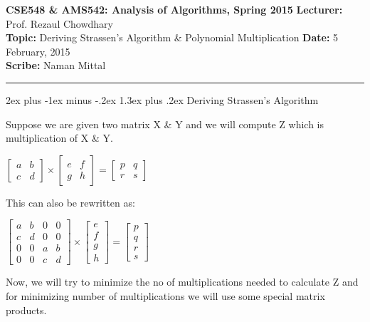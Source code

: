 \documentclass[11pt]{article}
\makeatletter
\renewcommand{\section}{\@startsection{section}{1}{0mm}%
                                   {2ex plus -1ex minus -.2ex}%
                                   {1.3ex plus .2ex}%
                                   {\normalfont\Large\bfseries}}%
\newcommand{\headings}[4]{
{\bf CSE548 \& AMS542: Analysis of Algorithms, Spring 2015} \hfill {{\bf Lecturer:} #1}\\
{{\bf Topic:} #2} \hfill {{\bf Date:} #3} \\
{{\bf Scribe:} #4}\\
\rule[0.1in]{\textwidth}{0.025in}
}
\makeatother
\begin{document}
\headings{Prof. Rezaul Chowdhary}{Deriving Strassen's Algorithm \& Polynomial Multiplication}{5 February, 2015}{Naman Mittal}
\newcommand{\lecnum}{3}  %

\section{Deriving Strassen's Algorithm}

Suppose we are given two matrix X \& Y and we will compute Z which is multiplication of X \& Y.

\begin{center}$\begin{bmatrix} a & b \\ c & d \end{bmatrix} \times \begin{bmatrix}e & f \\ g & h \end{bmatrix} = \begin{bmatrix} p & q \\ r & s \end{bmatrix}$\end{center}

This can also be rewritten as:

\begin{center}$\begin{bmatrix} a & b & 0 & 0 \\ c & d & 0 & 0 \\ 0 & 0 & a & b \\ 0 & 0 & c & d \end{bmatrix} \times \begin{bmatrix} e \\ f \\ g \\ h \end{bmatrix}= \begin{bmatrix} p \\ q \\ r \\ s \end{bmatrix}$\end{center}

Now, we will try to minimize the no of multiplications needed to calculate Z and for minimizing number of multiplications we will use some special matrix products.
\end{document}

